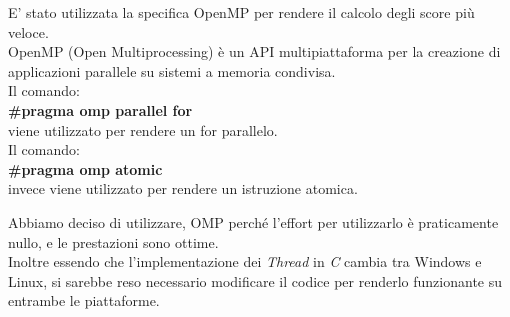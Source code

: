 \documentclass{beamer}
\begin{document}
\begin{frame}[fragile]
E' stato utilizzata la specifica OpenMP per rendere il calcolo degli score più veloce.\\
\medskip
OpenMP (Open Multiprocessing) è un API multipiattaforma per la creazione di applicazioni parallele su sistemi a memoria condivisa.\\
\smallskip
Il comando:\\
\textbf{\#pragma omp parallel for}\\
viene utilizzato per rendere un for parallelo.\\
\smallskip
Il comando:\\
\textbf{\#pragma omp atomic}\\
invece viene utilizzato per rendere un istruzione atomica.\\
\end{frame}

\begin{frame}
Abbiamo deciso di utilizzare, OMP perché l'effort per utilizzarlo è praticamente nullo, e le prestazioni sono ottime.\\
\medskip
Inoltre essendo che l'implementazione dei \textit{Thread} in \textit{C} cambia tra Windows e Linux, si sarebbe reso necessario modificare il codice per renderlo funzionante su entrambe le piattaforme.
\end{frame}
\end{document}

